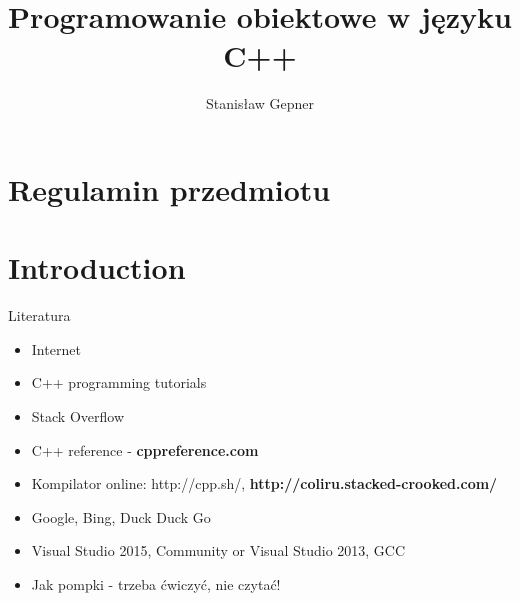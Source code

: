 \documentclass[10pt]{beamer}
\title{Programowanie obiektowe w języku C++}
\author[shortname]{Stanis{\l}aw Gepner}
\institute[shortinst]{sgepner@meil.pw.edu.pl}
\date{}
\begin{document}
\frame{
    \titlepage
}

\section{Regulamin przedmiotu}




\section{Introduction}

\begin{frame}{Literatura}
  \begin{itemize}
    \item Internet
    \item C++ programming tutorials
    \item Stack Overflow
    \item C++ reference - {\color{red} \bf cppreference.com}
    \item Kompilator online: http://cpp.sh/, {\color{red} \bf http://coliru.stacked-crooked.com/}
    \item Google, Bing, Duck Duck Go
    \item Visual Studio 2015, Community or Visual Studio 2013, GCC
    \item Jak pompki - trzeba ćwiczyć, nie czytać!
  \end{itemize}
\end{frame}
\end{document}
